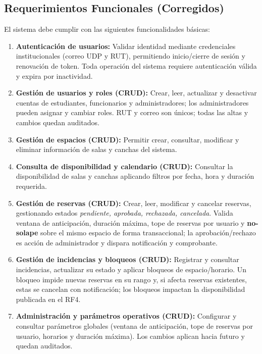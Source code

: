 \documentclass[a4paper, titlepage, 12pt]{article}
\begin{document}
\subsection{Requerimientos Funcionales (Corregidos)}
El sistema debe cumplir con las siguientes funcionalidades básicas:

\begin{enumerate}
    \item \textbf{Autenticación de usuarios:} Validar identidad mediante credenciales institucionales (correo UDP y RUT), permitiendo inicio/cierre de sesión y renovación de token. Toda operación del sistema requiere autenticación válida y expira por inactividad.
    
    \item \textbf{Gestión de usuarios y roles (CRUD):} Crear, leer, actualizar y desactivar cuentas de estudiantes, funcionarios y administradores; los administradores pueden asignar y cambiar roles. RUT y correo son únicos; todas las altas y cambios quedan auditados.
    
    \item \textbf{Gestión de espacios (CRUD):} Permitir crear, consultar, modificar y eliminar información de salas y canchas del sistema.
    
    \item \textbf{Consulta de disponibilidad y calendario (CRUD):} Consultar la disponibilidad de salas y canchas aplicando filtros por fecha, hora y duración requerida.
    
    \item \textbf{Gestión de reservas (CRUD):} Crear, leer, modificar y cancelar reservas, gestionando estados \emph{pendiente, aprobada, rechazada, cancelada}. Valida ventana de anticipación, duración máxima, tope de reservas por usuario y \textbf{no-solape} sobre el mismo espacio de forma transaccional; la aprobación/rechazo es acción de administrador y dispara notificación y comprobante.
    
    \item \textbf{Gestión de incidencias y bloqueos (CRUD):} Registrar y consultar incidencias, actualizar su estado y aplicar bloqueos de espacio/horario. Un bloqueo impide nuevas reservas en su rango y, si afecta reservas existentes, estas se cancelan con notificación; los bloqueos impactan la disponibilidad publicada en el RF4.
    
    \item \textbf{Administración y parámetros operativos (CRUD):} Configurar y consultar parámetros globales (ventana de anticipación, tope de reservas por usuario, horarios y duración máxima). Los cambios aplican hacia futuro y quedan auditados.
    

\end{enumerate}
\end{document}
